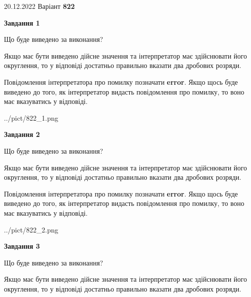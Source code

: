 \documentclass[12pt, ukrainian]{article}
\begin{document}
{20.12.2022 Варіант \No \textbf { 822 }\par}
{
\begin {Large}

{\begin {center}\textbf{Завдання 1}\end {center}}\par
Що буде виведено за виконання? \par

Якщо має бути виведено дійсне значення та інтерпретатор має здійснювати його округлення, 
то у відповіді достатньо правильно вказати два дробових розряди.

Повідомлення інтерпретатора про помилку позначати \textbf{error}.
Якщо щось буде виведено до того, як інтерпретатор видасть повідомлення про помилку, 
то воно має вказуватись у відповіді. \par

\begin{center}
	{../pict/822_1.png}
\end{center}
\newpage

{\begin {center}\textbf{Завдання 2}\end {center}}\par
Що буде виведено за виконання? \par

Якщо має бути виведено дійсне значення та інтерпретатор має здійснювати його округлення, 
то у відповіді достатньо правильно вказати два дробових розряди.

Повідомлення інтерпретатора про помилку позначати \textbf{error}.
Якщо щось буде виведено до того, як інтерпретатор видасть повідомлення про помилку, 
то воно має вказуватись у відповіді. \par

\begin{center}
	{../pict/822_2.png}
\end{center}
\newpage

{\begin {center}\textbf{Завдання 3}\end {center}}\par
Що буде виведено за виконання? \par

Якщо має бути виведено дійсне значення та інтерпретатор має здійснювати його округлення, 
то у відповіді достатньо правильно вказати два дробових розряди.


\end{Large}}
\end{document}
